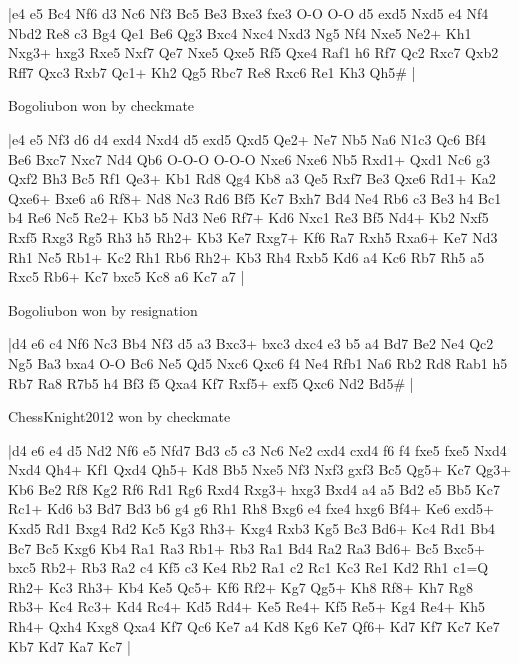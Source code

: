 \makegametitle
|e4 e5 Bc4 Nf6 d3 Nc6 Nf3 Bc5 Be3 Bxe3 fxe3 O-O O-O d5 exd5 Nxd5 e4 Nf4 Nbd2 Re8 c3 Bg4 Qe1 Be6 Qg3 Bxc4 Nxc4 Nxd3 Ng5 Nf4 Nxe5 Ne2+ Kh1 Nxg3+ hxg3 Rxe5 Nxf7 Qe7 Nxe5 Qxe5 Rf5 Qxe4 Raf1 h6 Rf7 Qc2 Rxc7 Qxb2 Rff7 Qxc3 Rxb7 Qc1+ Kh2 Qg5 Rbc7 Re8 Rxc6 Re1 Kh3 Qh5\#  |

\showboard

Bogoliubon won by checkmate

\makegametitle
|e4 e5 Nf3 d6 d4 exd4 Nxd4 d5 exd5 Qxd5 Qe2+ Ne7 Nb5 Na6 N1c3 Qc6 Bf4 Be6 Bxc7 Nxc7 Nd4 Qb6 O-O-O O-O-O Nxe6 Nxe6 Nb5 Rxd1+ Qxd1 Nc6 g3 Qxf2 Bh3 Bc5 Rf1 Qe3+ Kb1 Rd8 Qg4 Kb8 a3 Qe5 Rxf7 Be3 Qxe6 Rd1+ Ka2 Qxe6+ Bxe6 a6 Rf8+ Nd8 Nc3 Rd6 Bf5 Kc7 Bxh7 Bd4 Ne4 Rb6 c3 Be3 h4 Bc1 b4 Re6 Nc5 Re2+ Kb3 b5 Nd3 Ne6 Rf7+ Kd6 Nxc1 Re3 Bf5 Nd4+ Kb2 Nxf5 Rxf5 Rxg3 Rg5 Rh3 h5 Rh2+ Kb3 Ke7 Rxg7+ Kf6 Ra7 Rxh5 Rxa6+ Ke7 Nd3 Rh1 Nc5 Rb1+ Kc2 Rh1 Rb6 Rh2+ Kb3 Rh4 Rxb5 Kd6 a4 Kc6 Rb7 Rh5 a5 Rxc5 Rb6+ Kc7 bxc5 Kc8 a6 Kc7 a7  |

\showboard

Bogoliubon won by resignation

\makegametitle
|d4 e6 c4 Nf6 Nc3 Bb4 Nf3 d5 a3 Bxc3+ bxc3 dxc4 e3 b5 a4 Bd7 Be2 Ne4 Qc2 Ng5 Ba3 bxa4 O-O Bc6 Ne5 Qd5 Nxc6 Qxc6 f4 Ne4 Rfb1 Na6 Rb2 Rd8 Rab1 h5 Rb7 Ra8 R7b5 h4 Bf3 f5 Qxa4 Kf7 Rxf5+ exf5 Qxc6 Nd2 Bd5\#  |

\showboard

ChessKnight2012 won by checkmate

\makegametitle
|d4 e6 e4 d5 Nd2 Nf6 e5 Nfd7 Bd3 c5 c3 Nc6 Ne2 cxd4 cxd4 f6 f4 fxe5 fxe5 Nxd4 Nxd4 Qh4+ Kf1 Qxd4 Qh5+ Kd8 Bb5 Nxe5 Nf3 Nxf3 gxf3 Bc5 Qg5+ Kc7 Qg3+ Kb6 Be2 Rf8 Kg2 Rf6 Rd1 Rg6 Rxd4 Rxg3+ hxg3 Bxd4 a4 a5 Bd2 e5 Bb5 Kc7 Rc1+ Kd6 b3 Bd7 Bd3 b6 g4 g6 Rh1 Rh8 Bxg6 e4 fxe4 hxg6 Bf4+ Ke6 exd5+ Kxd5 Rd1 Bxg4 Rd2 Kc5 Kg3 Rh3+ Kxg4 Rxb3 Kg5 Bc3 Bd6+ Kc4 Rd1 Bb4 Bc7 Bc5 Kxg6 Kb4 Ra1 Ra3 Rb1+ Rb3 Ra1 Bd4 Ra2 Ra3 Bd6+ Bc5 Bxc5+ bxc5 Rb2+ Rb3 Ra2 c4 Kf5 c3 Ke4 Rb2 Ra1 c2 Rc1 Kc3 Re1 Kd2 Rh1 c1=Q Rh2+ Kc3 Rh3+ Kb4 Ke5 Qc5+ Kf6 Rf2+ Kg7 Qg5+ Kh8 Rf8+ Kh7 Rg8 Rb3+ Kc4 Rc3+ Kd4 Rc4+ Kd5 Rd4+ Ke5 Re4+ Kf5 Re5+ Kg4 Re4+ Kh5 Rh4+ Qxh4 Kxg8 Qxa4 Kf7 Qc6 Ke7 a4 Kd8 Kg6 Ke7 Qf6+ Kd7 Kf7 Kc7 Ke7 Kb7 Kd7 Ka7 Kc7  |

